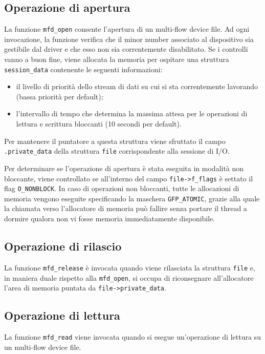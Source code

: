 \documentclass{article}
\begin{document}
\subsection{Operazione di apertura}
La funzione \texttt{mfd\_open} consente l'apertura di un multi-flow device file. Ad ogni invocazione, la funzione verifica che il minor number associato al dispositivo sia gestibile dal driver e che esso non sia correntemente disabilitato. Se i controlli vanno a buon fine, viene allocata la memoria per ospitare una struttura \texttt{session\_data} contenente le seguenti informazioni:
\begin{itemize}
\item il livello di priorità dello stream di dati su cui si sta correntemente lavorando (bassa priorità per default);
\item l'intervallo di tempo che determina la massima attesa per le operazioni di lettura e scrittura bloccanti (10 secondi per default).
\end{itemize}
Per mantenere il puntatore a questa struttura viene sfruttato il campo \texttt{.private\_data} della struttura \texttt{file} corrispondente alla sessione di I/O.

Per determinare se l'operazione di apertura è stata eseguita in modalità non bloccante, viene controllato se all'interno del campo \texttt{file->f\_flags} è settato il flag \texttt{O\_NONBLOCK}. In caso di operazioni non bloccanti, tutte le allocazioni di memoria vengono eseguite specificando la maschera \texttt{GFP\_ATOMIC}, grazie alla quale la chiamata verso l'allocatore di memoria può fallire senza portare il thread a dormire qualora non vi fosse memoria immediatamente disponibile.

\subsection{Operazione di rilascio}
La funzione \texttt{mfd\_release} è invocata quando viene rilasciata la struttura \texttt{file} e, in maniera duale rispetto alla \texttt{mfd\_open}, si occupa di riconsegnare all'allocatore l'area di memoria puntata da \texttt{file->private\_data}.

\subsection{Operazione di lettura}
La funzione \texttt{mfd\_read} viene invocata quando si esegue un'operazione di lettura su un multi-flow device file.
\end{document}
